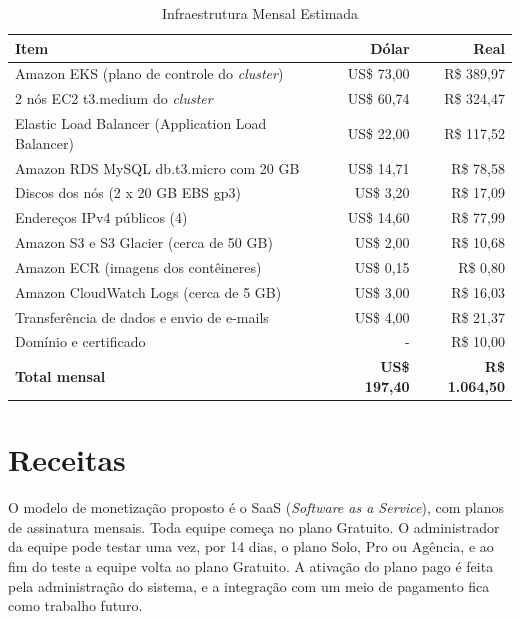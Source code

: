 \begin{table}[H]
\centering
\small
\caption{Infraestrutura Mensal Estimada}
\label{tab:infra}
\begin{tabular}{|p{8cm}|r|r|}
\hline
\textbf{Item} & \textbf{Dólar} & \textbf{Real} \\
\hline
Amazon EKS (plano de controle do \textit{cluster}) & US\$ 73,00 & R\$ 389,97 \\
\hline
2 nós EC2 t3.medium do \textit{cluster} & US\$ 60,74 & R\$ 324,47 \\
\hline
Elastic Load Balancer (Application Load Balancer) & US\$ 22,00 & R\$ 117,52 \\
\hline
Amazon RDS MySQL db.t3.micro com 20 GB & US\$ 14,71 & R\$ 78,58 \\
\hline
Discos dos nós (2 x 20 GB EBS gp3) & US\$ 3,20 & R\$ 17,09 \\
\hline
Endereços IPv4 públicos (4) & US\$ 14,60 & R\$ 77,99 \\
\hline
Amazon S3 e S3 Glacier (cerca de 50 GB) & US\$ 2,00 & R\$ 10,68 \\
\hline
Amazon ECR (imagens dos contêineres) & US\$ 0,15 & R\$ 0,80 \\
\hline
Amazon CloudWatch Logs (cerca de 5 GB) & US\$ 3,00 & R\$ 16,03 \\
\hline
Transferência de dados e envio de e-mails & US\$ 4,00 & R\$ 21,37 \\
\hline
Domínio e certificado & - & R\$ 10,00 \\
\hline
\textbf{Total mensal} & \textbf{US\$ 197,40} & \textbf{R\$ 1.064,50} \\
\hline
\end{tabular}
\end{table}

\section{Receitas}

O modelo de monetização proposto é o SaaS (\textit{Software as a Service}), com planos de assinatura mensais. Toda equipe começa no plano Gratuito. O administrador da equipe pode testar uma vez, por 14 dias, o plano Solo, Pro ou Agência, e ao fim do teste a equipe volta ao plano Gratuito. A ativação do plano pago é feita pela administração do sistema, e a integração com um meio de pagamento fica como trabalho futuro.

